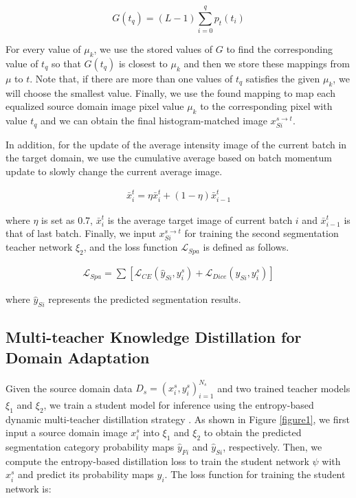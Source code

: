 \documentclass[letterpaper]{article} %
\begin{document}
{\small
\begin{equation}
    G(t_q)=(L-1) \sum_{i=0}^{q}p_t(t_i)\label{eq4}
\end{equation}
}

For every value of $\mu_k$, we use the stored values of $G$ to find the corresponding value of $t_q$ so that $G(t_q)$
is closest to $\mu_k$ and then we store these mappings from $\mu$ to $t$. Note that, if there are more than one values
of $t_q$ satisfies the given $\mu_k$, we will choose the smallest value. Finally, we use the found mapping to map
each equalized source domain image pixel value $\mu_k$ to the corresponding pixel with value $t_q$
and we can obtain the final histogram-matched image $x_{Si}^{s\to{t}}$.

In addition, for the update of the average intensity image of the current batch in the target domain, we use
the cumulative average based on batch momentum update to slowly change the current average image.

{\small
\begin{align}
    \bar{x}_i^t=\eta\bar{x}_i^t+(1-\eta)\bar{x}_{i-1}^t\label{eq5}
\end{align}
}

\noindent
where $\eta$ is set as 0.7, $\bar{x}_i^t$ is the average target image of current batch $i$ and $\bar{x}_{i-1}^t$ is that of last batch. Finally, we input $x_{Si}^{s\to{t}}$ for training the second segmentation teacher
network $\xi_2$, and the loss function $\mathcal{L}_{Spa}$ is defined as follows.

{\small
\begin{align}
    \mathcal{L}_{Spa}=\sum\left[ \mathcal{L}_{CE}\left(\hat{y}_{Si},y_i^s\right)+ \mathcal{L}_{Dice} \left(\hat{y}_{Si},y_i^s \right)\right]\label{eq6}
\end{align}
}

\noindent
where $\hat{y}_{Si}$ represents the predicted segmentation results.

\subsection{Multi-teacher Knowledge Distillation for Domain Adaptation}

Given the source domain data $D_s={(x_i^s,y_i^s)}_{i=1}^{N_s}$ and two trained teacher models  $\xi_1$ and $\xi_2$,
we train a student model for inference using the entropy-based
dynamic multi-teacher distillation strategy \cite{34}. As shown in Figure \ref{figure1}, we first
input a source domain image $x_i^s$ into $\xi_1$ and $\xi_2$ to obtain the predicted
segmentation category probability maps $\hat{y}_{Fi}$ and $\hat{y}_{Si}$, respectively. Then, we compute the entropy-based distillation
loss to train the student network $\psi$ with $x_i^s$ and predict its probability maps $\hat{y}_{i}$.
The loss function for training the student network is:
\end{document}
